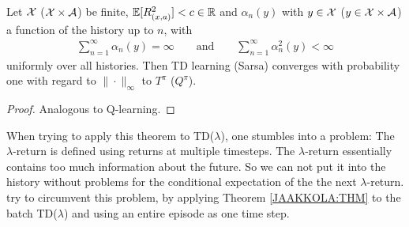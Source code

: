 \begin{corollary}[TD(\(0\))]
    Let \(\mathcal{X}\) (\(\mathcal{X}\times\mathcal{A}\)) be finite, \(\mathbb{E}[R_{(x,a)}^2]<c\in\mathbb{R}\) and \(\alpha_n(y)\) with \(y\in\mathcal{X}\) (\(y\in\mathcal{X}\times\mathcal{A}\)) a function of the history up to \(n\), with
    \begin{align}\label{learning rate:TD learning}
        \sum_{n=1}^\infty \alpha_n(y)=\infty \qquad \text{and}\qquad \sum_{n=1}^\infty \alpha_n^2(y)<\infty
    \end{align}
    uniformly over all histories.
    Then TD learning (Sarsa) converges with probability one with regard to \(\|\cdot\|_\infty\) to \(T^\pi\) (\(Q^\pi\)). 
\end{corollary}
\begin{proof}
    Analogous to Q-learning.
\end{proof}

When trying to apply this theorem to TD(\(\lambda\)), one stumbles into a problem: The \(\lambda\)-return is defined using returns at multiple timesteps. The \(\lambda\)-return essentially contains too much information about the future. So we can not put it into the history without problems for the conditional expectation of the the next \(\lambda\)-return. \textcite{jaakkolaConvergenceStochasticIterative1994a} try to circumvent this problem, by applying Theorem \ref{JAAKKOLA:THM} to the batch TD(\(\lambda\)) and using an entire episode as one time step. 

